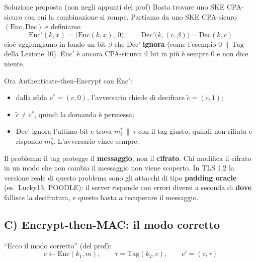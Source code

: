 \begin{approfondimento}{Soluzione proposta (non negli appunti del prof)}
Basta trovare uno SKE CPA-sicuro con cui la combinazione si rompe. Partiamo da uno SKE CPA-sicuro \((\text{Enc}, \text{Dec})\) e definiamo
\[
\text{Enc}'(k, x) = \big(\text{Enc}(k, x),\ 0\big), \qquad \text{Dec}'\big(k, (c, \beta)\big) = \text{Dec}(k, c)
\]
cioè aggiungiamo in fondo un bit \(\beta\) che Dec' \textbf{ignora} (come l'esempio \(0 \,\|\, \text{Tag}\) della Lezione 10). Enc' è ancora CPA-sicuro: il bit in più è sempre 0 e non dice niente.

Ora Authenticate-then-Encrypt con Enc':
\begin{itemize}
  \item dalla sfida \(c^* = (c, 0)\), l'avversario chiede di decifrare \(\tilde{c} = (c, 1)\);
  \item \(\tilde{c} \ne c^*\), quindi la domanda è permessa;
  \item Dec' ignora l'ultimo bit e trova \(m_b^* \,\|\, \tau\) con il tag giusto, quindi non rifiuta e risponde \(m_b^*\). L'avversario vince sempre.
\end{itemize}
Il problema: il tag protegge il \textbf{messaggio}, non il \textbf{cifrato}. Chi modifica il cifrato in un modo che non cambia il messaggio non viene scoperto. In TLS 1.2 la versione reale di questo problema sono gli attacchi di tipo \textbf{padding oracle} (es.\ Lucky13, POODLE): il server risponde con errori diversi a seconda di \textbf{dove} fallisce la decifratura, e questo basta a recuperare il messaggio.
\end{approfondimento}

\subsection{C) Encrypt-then-MAC: il modo corretto}

``Ecco il modo corretto'' (del prof):
\[
c \leftarrow \text{Enc}(k_1, m), \qquad \tau = \text{Tag}(k_2, c), \qquad c' = (c, \tau)
\]

